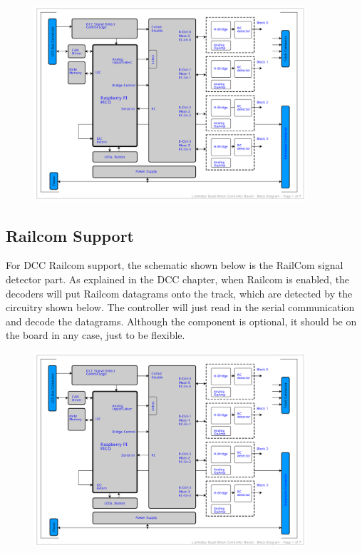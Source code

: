 \begin{figure}[htbp]
    \centering
    \includegraphics[page=4, width=0.9\textwidth]{./Schematics/Schematic_LcsNodes-Quad-Block-Controller.pdf}
\end{figure}
\FloatBarrier

\subsection{Railcom Support}

For DCC Railcom support, the schematic shown below is the RailCom signal detector part. As explained in the DCC chapter, when Railcom is enabled, the decoders will put Railcom datagrams onto the track, which are detected by the circuitry shown below. The controller will just read in the serial communication and decode the datagrams. Although the component is optional, it should be on the board in any case, just to be flexible.

\begin{figure}[htbp]
    \centering
    \includegraphics[page=5, width=0.9\textwidth]{./Schematics/Schematic_LcsNodes-Quad-Block-Controller.pdf}
\end{figure}
\FloatBarrier

